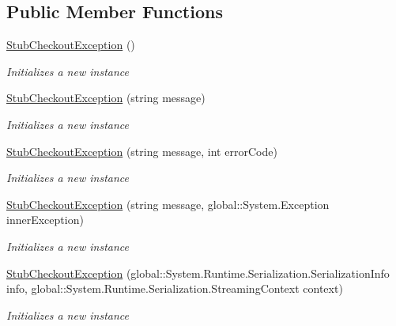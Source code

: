 \subsection*{Public Member Functions}
\begin{DoxyCompactItemize}
\item 
\hyperlink{class_system_1_1_component_model_1_1_design_1_1_fakes_1_1_stub_checkout_exception_ad91816a14922477dacf81c381a827dff}{Stub\-Checkout\-Exception} ()
\begin{DoxyCompactList}\small\item\em Initializes a new instance\end{DoxyCompactList}\item 
\hyperlink{class_system_1_1_component_model_1_1_design_1_1_fakes_1_1_stub_checkout_exception_a07f39ffbb7984dd86d40173b71bc8adb}{Stub\-Checkout\-Exception} (string message)
\begin{DoxyCompactList}\small\item\em Initializes a new instance\end{DoxyCompactList}\item 
\hyperlink{class_system_1_1_component_model_1_1_design_1_1_fakes_1_1_stub_checkout_exception_abb16f9aaea0d20941694a585bcba698b}{Stub\-Checkout\-Exception} (string message, int error\-Code)
\begin{DoxyCompactList}\small\item\em Initializes a new instance\end{DoxyCompactList}\item 
\hyperlink{class_system_1_1_component_model_1_1_design_1_1_fakes_1_1_stub_checkout_exception_a41c96aeee3c941ec18e4b08f62f01420}{Stub\-Checkout\-Exception} (string message, global\-::\-System.\-Exception inner\-Exception)
\begin{DoxyCompactList}\small\item\em Initializes a new instance\end{DoxyCompactList}\item 
\hyperlink{class_system_1_1_component_model_1_1_design_1_1_fakes_1_1_stub_checkout_exception_af8d261f155657c43b185e3bc293e5836}{Stub\-Checkout\-Exception} (global\-::\-System.\-Runtime.\-Serialization.\-Serialization\-Info info, global\-::\-System.\-Runtime.\-Serialization.\-Streaming\-Context context)
\begin{DoxyCompactList}\small\item\em Initializes a new instance\end{DoxyCompactList}\item 

\end{DoxyCompactItemize}
